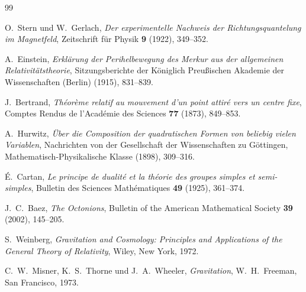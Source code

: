\documentclass[11pt,a4paper]{article}
\theoremstyle{definition}
\theoremstyle{remark}
\begin{document}
\begin{thebibliography}{99}

O.~Stern und W.~Gerlach,
\emph{Der experimentelle Nachweis der Richtungsquantelung im Magnetfeld},
Zeitschrift für Physik \textbf{9} (1922), 349--352.

A.~Einstein,
\emph{Erklärung der Perihelbewegung des Merkur aus der allgemeinen Relativitätstheorie},
Sitzungsberichte der Königlich Preußischen Akademie der Wissenschaften (Berlin) (1915),
831--839.

J.~Bertrand,
\emph{Théorème relatif au mouvement d'un point attiré vers un centre fixe},
Comptes Rendus de l'Académie des Sciences \textbf{77} (1873), 849--853.

A.~Hurwitz,
\emph{Über die Composition der quadratischen Formen von beliebig vielen Variablen},
Nachrichten von der Gesellschaft der Wissenschaften zu Göttingen, Mathematisch-Physikalische
Klasse (1898), 309--316.

É.~Cartan,
\emph{Le principe de dualité et la théorie des groupes simples et semi-simples},
Bulletin des Sciences Mathématiques \textbf{49} (1925), 361--374.

J.~C.~Baez,
\emph{The Octonions},
Bulletin of the American Mathematical Society \textbf{39} (2002), 145--205.

S.~Weinberg,
\emph{Gravitation and Cosmology: Principles and Applications of the General Theory of
Relativity},
Wiley, New York, 1972.

C.~W.~Misner, K.~S.~Thorne und J.~A.~Wheeler,
\emph{Gravitation},
W.~H.~Freeman, San Francisco, 1973.

\end{thebibliography}
\end{document}
